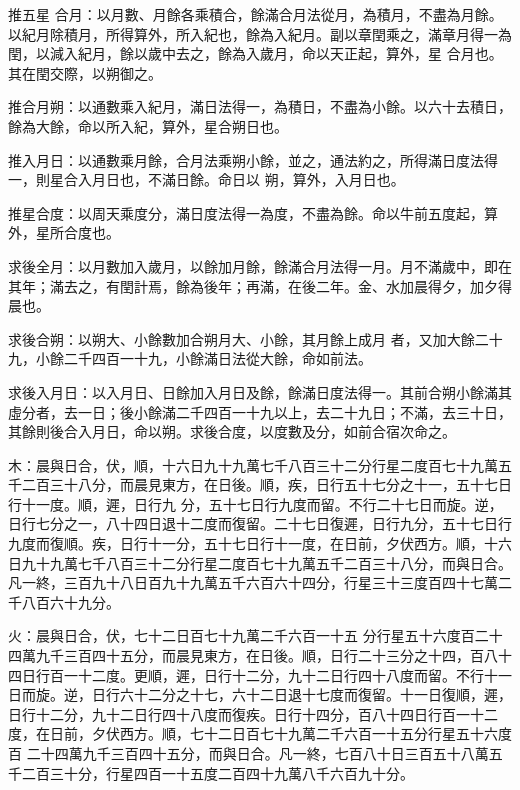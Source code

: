 \begin{pinyinscope}
 推五星
 合月：以月數、月餘各乘積合，餘滿合月法從月，為積月，不盡為月餘。以紀月除積月，所得算外，所入紀也，餘為入紀月。副以章閏乘之，滿章月得一為閏，以減入紀月，餘以歲中去之，餘為入歲月，命以天正起，算外，星
 合月也。其在閏交際，以朔御之。



 推合月朔：以通數乘入紀月，滿日法得一，為積日，不盡為小餘。以六十去積日，餘為大餘，命以所入紀，算外，星合朔日也。



 推入月日：以通數乘月餘，合月法乘朔小餘，並之，通法約之，所得滿日度法得一，則星合入月日也，不滿日餘。命日以
 朔，算外，入月日也。



 推星合度：以周天乘度分，滿日度法得一為度，不盡為餘。命以牛前五度起，算外，星所合度也。



 求後全月：以月數加入歲月，以餘加月餘，餘滿合月法得一月。月不滿歲中，即在其年；滿去之，有閏計焉，餘為後年；再滿，在後二年。金、水加晨得夕，加夕得晨也。



 求後合朔：以朔大、小餘數加合朔月大、小餘，其月餘上成月
 者，又加大餘二十九，小餘二千四百一十九，小餘滿日法從大餘，命如前法。



 求後入月日：以入月日、日餘加入月日及餘，餘滿日度法得一。其前合朔小餘滿其虛分者，去一日；後小餘滿二千四百一十九以上，去二十九日；不滿，去三十日，其餘則後合入月日，命以朔。求後合度，以度數及分，如前合宿次命之。



 木：晨與日合，伏，順，十六日九十九萬七千八百三十二分行星二度百七十九萬五千二百三十八分，而晨見東方，在日後。順，疾，日行五十七分之十一，五十七日行十一度。順，遲，日行九
 分，五十七日行九度而留。不行二十七日而旋。逆，日行七分之一，八十四日退十二度而復留。二十七日復遲，日行九分，五十七日行九度而復順。疾，日行十一分，五十七日行十一度，在日前，夕伏西方。順，十六日九十九萬七千八百三十二分行星二度百七十九萬五千二百三十八分，而與日合。凡一終，三百九十八日百九十九萬五千六百六十四分，行星三十三度百四十七萬二千八百六十九分。



 火：晨與日合，伏，七十二日百七十九萬二千六百一十五
 分行星五十六度百二十四萬九千三百四十五分，而晨見東方，在日後。順，日行二十三分之十四，百八十四日行百一十二度。更順，遲，日行十二分，九十二日行四十八度而留。不行十一
 日而旋。逆，日行六十二分之十七，六十二日退十七度而復留。十一日復順，遲，日行十二分，九十二日行四十八度而復疾。日行十四分，百八十四日行百一十二度，在日前，夕伏西方。順，七十二日百七十九萬二千六百一十五分行星五十六度百
 二十四萬九千三百四十五分，而與日合。凡一終，七百八十日三百五十八萬五千二百三十分，行星四百一十五度二百四十九萬八千六百九十分。




\end{pinyinscope}
